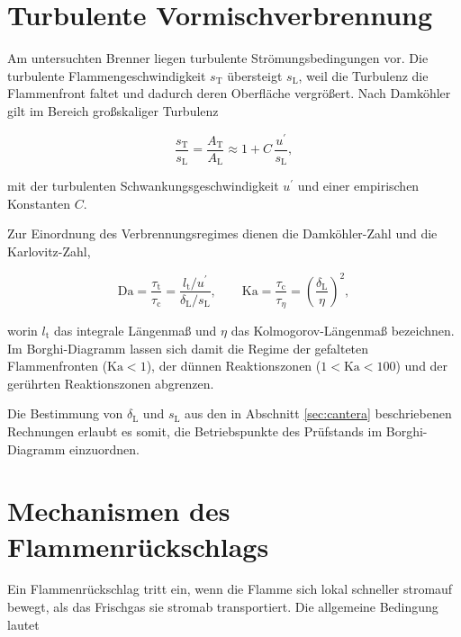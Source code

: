 \section{Turbulente Vormischverbrennung}\label{sec:turbulent}

Am untersuchten Brenner liegen turbulente Strömungsbedingungen vor. Die
turbulente Flammengeschwindigkeit $s_\mathrm{T}$ übersteigt $s_\mathrm{L}$,
weil die Turbulenz die Flammenfront faltet und dadurch deren Oberfläche
vergrößert. Nach Damköhler \cite{Damkoehler_1940} gilt im Bereich großskaliger
Turbulenz

\begin{equation}
	\label{eq:damkoehler}
	\frac{s_\mathrm{T}}{s_\mathrm{L}} = \frac{A_\mathrm{T}}{A_\mathrm{L}}
	\approx 1 + C\,\frac{u^{\prime}}{s_\mathrm{L}},
\end{equation}

mit der turbulenten Schwankungsgeschwindigkeit $u^{\prime}$ und einer
empirischen Konstanten $C$.

Zur Einordnung des Verbrennungsregimes dienen die Damköhler-Zahl und die
Karlovitz-Zahl,

\begin{equation}
	\label{eq:da_ka}
	\mathrm{Da} = \frac{\tau_\mathrm{t}}{\tau_\mathrm{c}}
	= \frac{l_\mathrm{t}/u^{\prime}}{\delta_\mathrm{L}/s_\mathrm{L}},
	\qquad
	\mathrm{Ka} = \frac{\tau_\mathrm{c}}{\tau_\eta}
	= \left(\frac{\delta_\mathrm{L}}{\eta}\right)^{2},
\end{equation}

worin $l_\mathrm{t}$ das integrale Längenmaß und $\eta$ das
Kolmogorov-Längenmaß bezeichnen. Im Borghi-Diagramm \cite{Borghi_1985, Peters_2000}
lassen sich damit die Regime der gefalteten Flammenfronten
($\mathrm{Ka} < 1$), der dünnen Reaktionszonen
($1 < \mathrm{Ka} < 100$) und der gerührten Reaktionszonen abgrenzen.

Die Bestimmung von $\delta_\mathrm{L}$ und $s_\mathrm{L}$ aus den in
Abschnitt \ref{sec:cantera} beschriebenen Rechnungen erlaubt es somit, die
Betriebspunkte des Prüfstands im Borghi-Diagramm einzuordnen.

\section{Mechanismen des Flammenrückschlags}\label{sec:flashback}

Ein Flammenrückschlag tritt ein, wenn die Flamme sich lokal schneller stromauf
bewegt, als das Frischgas sie stromab transportiert. Die allgemeine Bedingung
lautet

